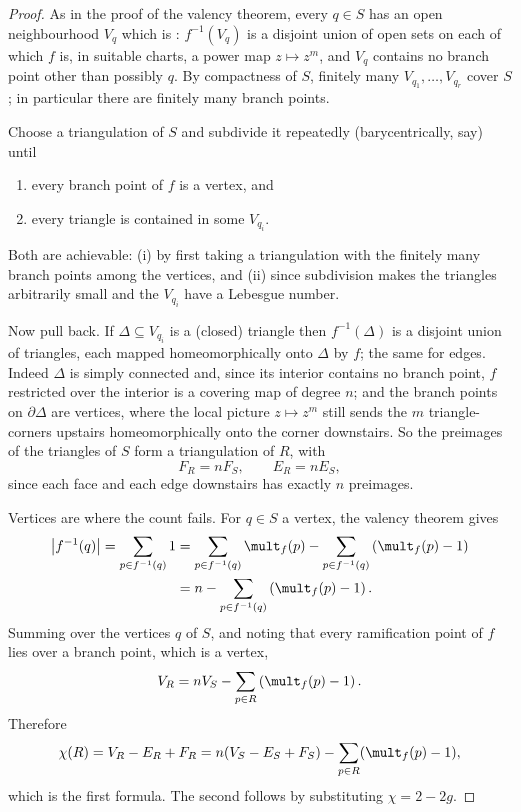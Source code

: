 \begin{proof}
	As in the proof of the valency theorem, every $q \in S$ has an open neighbourhood $V_q$
	which is : $f^{-1}(V_q)$ is a disjoint union of open sets on each of
	which $f$ is, in suitable charts, a power map $z \mapsto z^m$, and $V_q$ contains no
	branch point other than possibly $q$. By compactness of $S$, finitely many
	$V_{q_1},\dots,V_{q_r}$ cover $S$; in particular there are finitely many branch points.

	Choose a triangulation of $S$ and subdivide it repeatedly (barycentrically, say) until
	\begin{enumerate}[label=(\roman*)]
		\item every branch point of $f$ is a vertex, and
		\item every triangle is contained in some $V_{q_i}$.
	\end{enumerate}
	Both are achievable: (i) by first taking a triangulation with the finitely many branch
	points among the vertices, and (ii) since subdivision makes the triangles arbitrarily
	small and the $V_{q_i}$ have a Lebesgue number.

	Now pull back. If $\Delta \subseteq V_{q_i}$ is a (closed) triangle then
	$f^{-1}(\Delta)$ is a disjoint union of triangles, each mapped homeomorphically onto
	$\Delta$ by $f$; the same for edges. Indeed $\Delta$ is simply connected and, since its
	interior contains no branch point, $f$ restricted over the interior is a covering map of
	degree $n$; and the branch points on $\partial \Delta$ are vertices, where the local
	picture $z \mapsto z^m$ still sends the $m$ triangle-corners upstairs homeomorphically
	onto the corner downstairs. So the preimages of the triangles of $S$ form a
	triangulation of $R$, with
	$$
	F_R = n F_S, \qquad E_R = n E_S,
	$$
	since each face and each edge downstairs has exactly $n$ preimages.

	Vertices are where the count fails. For $q \in S$ a vertex, the valency theorem gives
	\begin{align*}
	\left|f^{-1}(q)\right| = \sum_{p \in f^{-1}(q)} 1
	&= \sum_{p\in f^{-1}(q)}\mult_f(p) - \sum_{p\in f^{-1}(q)}\left(\mult_f(p)-1\right)\\
	&= n - \sum_{p\in f^{-1}(q)}\left(\mult_f(p)-1\right).
	\end{align*}
	Summing over the vertices $q$ of $S$, and noting that every ramification point of $f$
	lies over a branch point, which is a vertex,
	$$
	V_R = nV_S - \sum_{p\in R}\left(\mult_f(p)-1\right).
	$$
	Therefore
	$$
	\chi(R) = V_R - E_R + F_R = n(V_S - E_S + F_S) - \sum_{p\in R}(\mult_f(p)-1),
	$$
	which is the first formula. The second follows by substituting $\chi = 2-2g$.
\end{proof}

